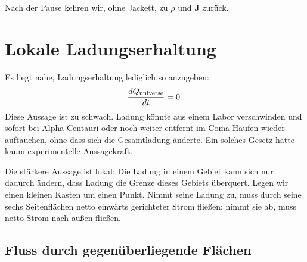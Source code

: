 \begin{classroomqa}\end{classroomqa}

Nach der Pause kehren wir, ohne Jackett, zu \(\rho\) und \(\mathbf J\) zurück.

\section{Lokale Ladungserhaltung}

Es liegt nahe, Ladungserhaltung lediglich so anzugeben:
\begin{equation}
\frac{dQ_{\rm universe}}{dt}=0.
\end{equation}
Diese Aussage ist zu schwach. Ladung könnte aus einem Labor verschwinden und sofort bei Alpha Centauri oder noch weiter entfernt im Coma-Haufen wieder auftauchen, ohne dass sich die Gesamtladung änderte. Ein solches Gesetz hätte kaum experimentelle Aussagekraft.

Die stärkere Aussage ist lokal: Die Ladung in einem Gebiet kann sich nur dadurch ändern, dass Ladung die Grenze dieses Gebiets überquert. Legen wir einen kleinen Kasten um einen Punkt. Nimmt seine Ladung zu, muss durch seine sechs Seitenflächen netto einwärts gerichteter Strom fließen; nimmt sie ab, muss netto Strom nach außen fließen.

\subsection{Fluss durch gegenüberliegende Flächen}

